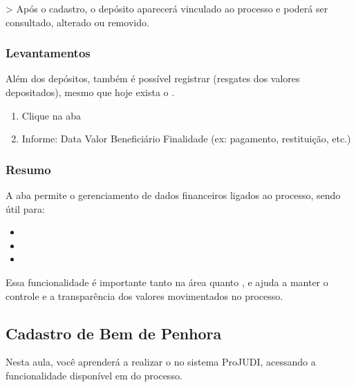 \documentclass[letterpaper,10pt,brazil]{sphinxmanual}
\begin{document}
\sphinxAtStartPar
\textgreater{} Após o cadastro, o depósito aparecerá vinculado ao processo e poderá ser consultado, alterado ou removido.


\subsubsection{Levantamentos}
\label{\detokenize{projud_20_cadastrodeposito:levantamentos}}
\sphinxAtStartPar
Além dos depósitos, também é possível registrar  (resgates dos valores depositados), mesmo que hoje exista o .
\begin{enumerate}
%
\item {} 
\sphinxAtStartPar
Clique na aba 

\item {} 
\sphinxAtStartPar
Informe:
\sphinxhyphen{} Data
\sphinxhyphen{} Valor
\sphinxhyphen{} Beneficiário
\sphinxhyphen{} Finalidade (ex: pagamento, restituição, etc.)

\end{enumerate}


\subsubsection{Resumo}
\label{\detokenize{projud_20_cadastrodeposito:resumo}}
\sphinxAtStartPar
A aba  permite o gerenciamento de dados financeiros ligados ao processo, sendo útil para:
\begin{itemize}
\item {} 
\sphinxAtStartPar
{}

\item {} 
\sphinxAtStartPar
{}

\item {} 
\sphinxAtStartPar
{}

\end{itemize}

\sphinxAtStartPar
Essa funcionalidade é importante tanto na área  quanto , e ajuda a manter o controle e a transparência dos valores movimentados no processo.

\sphinxstepscope


\subsection{Cadastro de Bem de Penhora}
\label{\detokenize{projud_21_cadastrobempenhora:cadastro-de-bem-de-penhora}}\label{\detokenize{projud_21_cadastrobempenhora::doc}}
\sphinxAtStartPar
Nesta aula, você aprenderá a realizar o  no sistema ProJUDI, acessando a funcionalidade disponível em  do processo.
\end{document}
